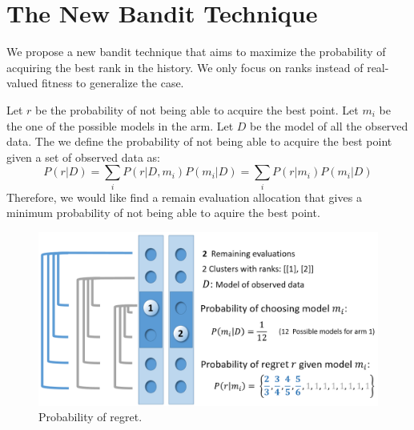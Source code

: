 \section{The New Bandit Technique}

We propose a new bandit technique that aims to maximize the probability of acquiring the best rank in the history.
We only focus on ranks instead of real-valued fitness to generalize the case.

Let $r$ be the probability of not being able to acquire the best point.
Let $m_i$ be the one of the possible models in the arm.
Let $D$ be the model of all the observed data.
The we define the probability of not being able to acquire the best point given a set of observed data as:
\begin{equation}
P(r|D) = \sum_{i} P(r|D, m_i)P(m_i|D) = \sum_{i}P(r|m_i)P(m_i|D) 
\end{equation}\label{equation:bandit}
Therefore, we would like find a remain evaluation allocation that gives a minimum probability of not being able to aquire the best point.

\begin{figure}
\centering
\includegraphics[width=\textwidth]{Bandit_arm}
\caption{Probability of regret.}\label{fig:Bandit_arm}
\end{figure} 

